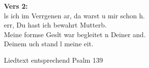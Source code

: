 \textbf{Vers 2:}\\
ls ich im Verrgenen ar, da warst u mir schon h.\\
err, Du hast ich bewahrt  Mutterb.\\
Meine formse Geslt war begleitet n Deiner and.\\
 Deinem uch stand l meine eit.\\


\begin{footnotesize}
Liedtext entsprechend Psalm 139
\end{footnotesize}